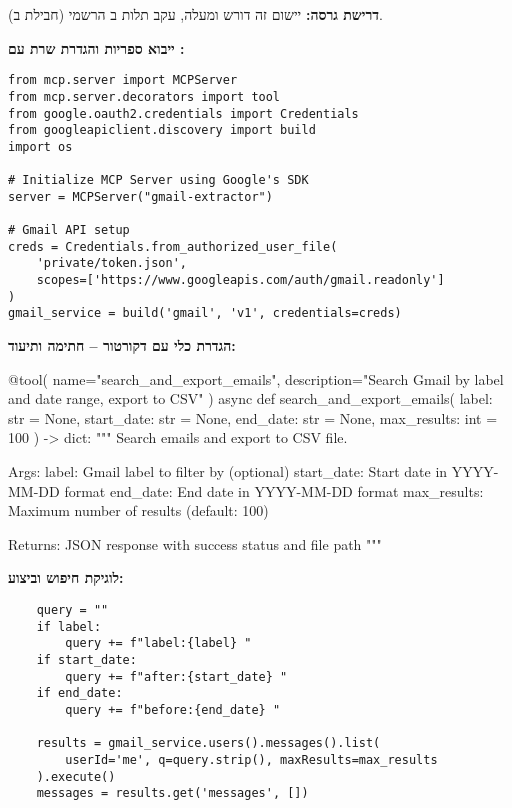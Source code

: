 
\textbf{דרישת גרסה:} יישום זה דורש  ומעלה, עקב תלות ב הרשמי (חבילת  ב).

\textbf{ייבוא ספריות והגדרת שרת  עם :}

\begin{english}
\begin{verbatim}
from mcp.server import MCPServer
from mcp.server.decorators import tool
from google.oauth2.credentials import Credentials
from googleapiclient.discovery import build
import os

# Initialize MCP Server using Google's SDK
server = MCPServer("gmail-extractor")

# Gmail API setup
creds = Credentials.from_authorized_user_file(
    'private/token.json',
    scopes=['https://www.googleapis.com/auth/gmail.readonly']
)
gmail_service = build('gmail', 'v1', credentials=creds)
\end{verbatim}
\end{english}

\textbf{הגדרת כלי עם דקורטור  – חתימה ותיעוד:}

\begin{pythonbox}
@tool(
    name="search_and_export_emails",
    description="Search Gmail by label and date range, export to CSV"
)
async def search_and_export_emails(
    label: str = None,
    start_date: str = None,
    end_date: str = None,
    max_results: int = 100
) -> dict:
    """
    Search emails and export to CSV file.

    Args:
        label: Gmail label to filter by (optional)
        start_date: Start date in YYYY-MM-DD format
        end_date: End date in YYYY-MM-DD format
        max_results: Maximum number of results (default: 100)

    Returns:
        JSON response with success status and file path
    """
\end{pythonbox}

\textbf{לוגיקת חיפוש וביצוע:}

\begin{english}
\begin{verbatim}
    query = ""
    if label:
        query += f"label:{label} "
    if start_date:
        query += f"after:{start_date} "
    if end_date:
        query += f"before:{end_date} "

    results = gmail_service.users().messages().list(
        userId='me', q=query.strip(), maxResults=max_results
    ).execute()
    messages = results.get('messages', [])
\end{verbatim}
\end{english}

